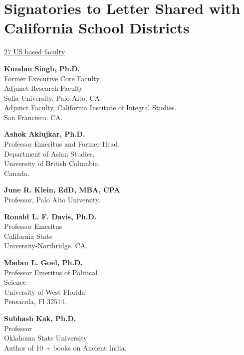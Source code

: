 \chapter[Signatories to Letter Shared with\\ California School Districts]{Signatories to Letter Shared with California School Districts}

\centerline{\underline{27 US based faculty}} 

\begin{multicols}{2}
\begin{trivlist}
\itemsep=10pt
\item \textbf{Kundan Singh, Ph.D.}\\ 
Former Executive Core Faculty\\
Adjunct Research Faculty\\
Sofia University. Palo Alto. CA\\
Adjunct Faculty, California Institute of Integral Studies.\\ 
San Francisco. CA. 

\item \textbf{Ashok Aklujkar, Ph.D.}\\ 
Professor Emeritus and Former Head,\\ 
Department of Asian Studies,\\ 
University of British Columbia.\\ 
Canada.

\item \textbf{June R. Klein, EdD, MBA, CPA}\\ 
Professor, Palo Alto University.


\item \textbf{Ronald L. F. Davis, Ph.D.}\\ 
Professor Emeritus\\ 
California State\\ 
University-Northridge. CA.

\item \textbf{Madan L. Goel, Ph.D.}\\ 
Professor Emeritus of Political\\ Science\\
University of West Florida\\
Pensacola, Fl 32514.

\item \textbf{Subhash Kak, Ph.D.}\\ 
Professor\\
Oklahoma State University\\
Author of 10 + books on Ancient India.\\


\end{trivlist}
\end{multicols}
